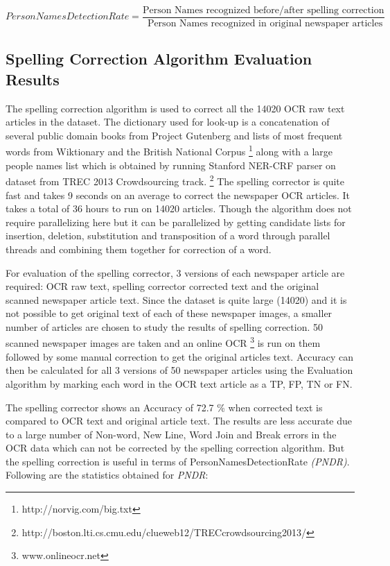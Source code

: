 \documentclass[letterpaper,11pt]{report}
\begin{document}
$Person Names Detection Rate=\dfrac{ \text{Person Names recognized before/after spelling correction}} {\text{ Person Names recognized in original newspaper articles}} $


\subsection{Spelling Correction Algorithm Evaluation Results}
The spelling correction algorithm is used to correct all the 14020 OCR raw text articles in the dataset. The dictionary used for look-up is a concatenation of several public domain books from Project Gutenberg and lists of most frequent words from Wiktionary and the British National Corpus \footnote{http://norvig.com/big.txt} along with a large people names list which is obtained  by running Stanford NER-CRF parser on dataset from TREC 2013 Crowdsourcing track. \footnote{http://boston.lti.cs.cmu.edu/clueweb12/TRECcrowdsourcing2013/}
The spelling corrector is quite fast and takes 9 seconds on an average to correct the newspaper OCR articles. It takes a total of 36 hours to run on 14020 articles.
Though the algorithm does not require parallelizing here but it can be parallelized by getting candidate lists for insertion, deletion, substitution and transposition of a word through parallel threads and combining them together for correction of a word.
 
For evaluation of the spelling corrector, 3 versions of each newspaper article are required: OCR raw text, spelling corrector corrected text and the original scanned newspaper article text. Since the dataset is quite large (14020) and it is not possible to get original text of each of these newspaper images, a smaller number of articles are chosen to study the results of spelling correction. 50 scanned newspaper images are taken and an online OCR \footnote{www.onlineocr.net} is run on them followed by some manual correction to get the original articles text. 
Accuracy can then be calculated for all 3 versions of 50 newspaper articles using the Evaluation algorithm by marking each word in the OCR text article as a TP, FP, TN or FN. 

The spelling corrector shows an Accuracy of 72.7 \%  when corrected text is compared to OCR text and original article text. The results are less accurate due to a large number of Non-word, New Line, Word Join and Break errors in the OCR data which can not be corrected by the spelling correction algorithm.
But the spelling correction is useful in terms of PersonNamesDetectionRate \textit{(PNDR)}. Following are the statistics obtained for \textit{PNDR}:
\end{document}
